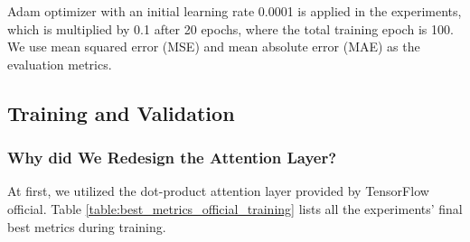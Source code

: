 \documentclass[sigconf]{acmart}
\begin{document}
Adam\cite{kingma2017adam} optimizer with an initial learning rate 0.0001 is applied in the experiments, which is multiplied by 0.1 after 20 epochs, where the total training epoch is 100.
We use mean squared error (MSE) and mean absolute error (MAE) as the evaluation metrics.


\subsection{Training and Validation} %

\subsubsection{Why did We Redesign the Attention Layer?}

At first, we utilized the dot-product attention layer provided by TensorFlow official. Table \ref{table:best_metrics_official_training} lists all the experiments' final best metrics during training.
\end{document}
